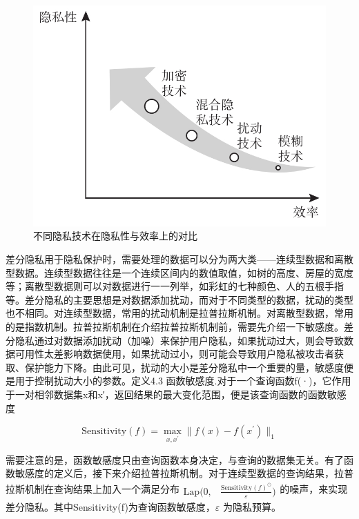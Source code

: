 \begin{figure}[htb]
\centering
    \includegraphics[scale=0.5]{figures/chapter4/Comparison of privacy and efficiency of different privacy technologies.jpg}
    \caption{不同隐私技术在隐私性与效率上的对比}
    \label{fig:Cluster the cars in the region}
\end{figure}

差分隐私用于隐私保护时，需要处理的数据可以分为两大类——连续型数据和离散型数据。连续型数据往往是一个连续区间内的数值取值，如树的高度、房屋的宽度等；离散型数据则可以对数据进行一一列举，如彩虹的七种颜色、人的五根手指等。差分隐私的主要思想是对数据添加扰动，而对于不同类型的数据，扰动的类型也不相同。对连续型数据，常用的扰动机制是拉普拉斯机制。对离散型数据，常用的是指数机制。拉普拉斯机制在介绍拉普拉斯机制前，需要先介绍一下敏感度。差分隐私通过对数据添加扰动（加噪）来保护用户隐私，如果扰动过大，则会导致数据可用性太差影响数据使用，如果扰动过小，则可能会导致用户隐私被攻击者获取、保护能力下降。由此可见，扰动的大小是差分隐私中一个重要的量，敏感度便是用于控制扰动大小的参数。定义4.3 函数敏感度.对于一个查询函数f(·)，它作用于一对相邻数据集x和x′，返回结果的最大变化范围，便是该查询函数的函数敏感度

\begin{equation}
\mathrm{Sensitivity}(f)=\max_{x,x^{\prime}}\parallel f(x)-f(x^{\prime})\parallel_{1}
\end{equation}

需要注意的是，函数敏感度只由查询函数本身决定，与查询的数据集无关。有了函数敏感度的定义后，接下来介绍拉普拉斯机制。对于连续型数据的查询结果，拉普拉斯机制在查询结果上加入一个满足分布$\begin{aligned}\text{Lap}\bigg(0,&\frac{\text{Sensitivity}(f)^{\odot}}{\varepsilon}\bigg)\end{aligned}$的噪声，来实现差分隐私。其中Sensitivity(f)为查询函数敏感度，$\varepsilon$ 为隐私预算。

